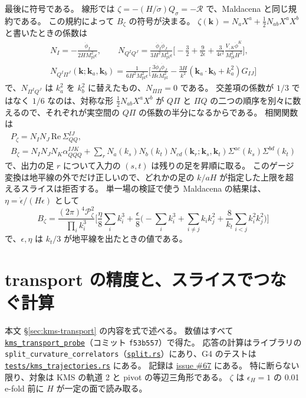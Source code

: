 \documentclass[a4paper,11pt]{ltjsarticle}
\newcommand{\Mpl}{M_{\mathrm{pl}}}
\newcommand{\code}[1]{\texttt{#1}}
\newcommand{\repourl}{https://github.com/inuverse44/phys-type-dev}
\begin{document}
最後に符号である。
線形では $\zeta=-(H/\dot\sigma)Q_\sigma=-\mathcal R$ で、Maldacena\cite{Maldacena2003} と同じ規約である。
この規約によって $B_\zeta$ の符号が決まる。
$\zeta(\mathbf k)=N_aX^a+\tfrac12N_{ab}X^aX^b$ と書いたときの係数は
\begin{gather*}
N_I=-\frac{\dot\phi_I}{2H\Mpl^2\epsilon},\qquad
N_{Q^IQ^J}=\frac{\dot\phi_I\dot\phi_J}{3H^2\Mpl^4\epsilon}\Big[-\frac32+\frac9{2\epsilon}+\frac3{4\epsilon^2}\frac{V_{,K}\dot\phi^K}{\Mpl^2H^3}\Big],\\
N_{Q^I\Pi^J}(\mathbf k;\mathbf k_a,\mathbf k_b)=\frac{1}{6H^2\Mpl^2\epsilon}\Big[\frac{3\dot\phi_I\dot\phi_J}{H\epsilon\Mpl^2}-\frac{3H}{k^2}(\mathbf k_a\!\cdot\!\mathbf k_b+k_a^2)G_{IJ}\Big]
\end{gather*}
で、$N_{\Pi^IQ^J}$ は $k_a^2$ を $k_b^2$ に替えたもの、$N_{\Pi\Pi}=0$ である。
交差項の係数が $1/3$ ではなく $1/6$ なのは、対称な形 $\tfrac12N_{ab}X^aX^b$ が $Q\Pi$ と $\Pi Q$ の二つの順序を別々に数えるので、それぞれが実空間の $Q\Pi$ の係数の半分になるからである。
相関関数は
\begin{gather*}
P_\zeta=N_IN_J\,\mathrm{Re}\,\Sigma_{QQ}^{IJ},\\
B_\zeta=N_IN_JN_K\alpha_{QQQ}^{IJK}+\sum_rN_a(k_s)N_b(k_t)N_{cd}(\mathbf k_r;\mathbf k_s,\mathbf k_t)\Sigma^{ac}(k_s)\Sigma^{bd}(k_t)
\end{gather*}
で、出力の足 $r$ について入力の $(s,t)$ は残りの足を昇順に取る。
このゲージ変換は地平線の外でだけ正しいので、どれかの足の $k/aH$ が指定した上限を超えるスライスは拒否する。
単一場の検証で使う Maldacena の結果は、$\eta=\dot\epsilon/(H\epsilon)$ として
\[
B_\zeta=\frac{(2\pi)^4\mathcal P_\zeta^2}{\prod_ik_i^3}\Big[\frac\eta8\sum_ik_i^3+\frac\epsilon8\Big(-\sum_ik_i^3+\sum_{i\neq j}k_ik_j^2+\frac8{k_t}\sum_{i<j}k_i^2k_j^2\Big)\Big]
\]
で、$\epsilon,\eta$ は $k_t/3$ が地平線を出たときの値である。

\section{transport の精度と、スライスでつなぐ計算}
\label{app:conditioning}

本文 \S\ref{sec:kms-transport} の内容を式で述べる。
数値はすべて \href{\repourl/blob/f53b557/crates/phys-type-models/examples/kms_transport_probe.rs}{\texttt{kms\_transport\_probe}}（コミット \code{f53b557}）で得た。
応答の計算はライブラリの \code{split\_curvature\_correlators}（\href{\repourl/blob/main/crates/phys-type/src/split.rs}{\texttt{split.rs}}）にあり、G4 のテストは \href{\repourl/blob/main/crates/phys-type-models/tests/kms_trajectories.rs}{\texttt{tests/kms\_trajectories.rs}} にある。
記録は \href{\repourl/issues/67}{issue \#67} にある。
特に断らない限り、対象は KMS の軌道 2 と pivot の等辺三角形である。
$\zeta$ は $\epsilon_H=1$ の 0.01 e-fold 前に $H$ が一定の面で読み取る。
\end{document}
